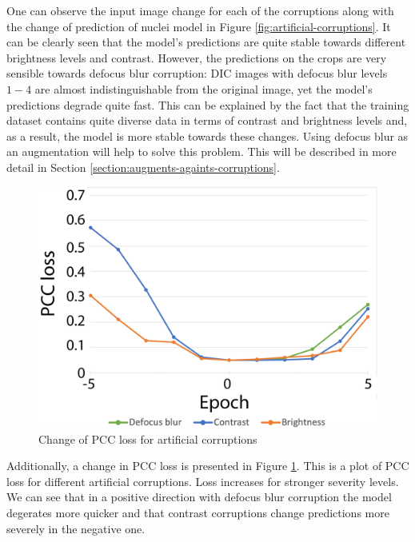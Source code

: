 One can observe the input image change for each of the corruptions along with the change of prediction of nuclei model in Figure \ref{fig:artificial-corruptions}. It can be clearly seen that the model's predictions are quite stable towards different brightness levels and contrast. However, the predictions on the crops are very sensible towards defocus blur corruption: DIC images with defocus blur levels $1-4$ are almost indistinguishable from the original image, yet the model's predictions degrade quite fast. This can be explained by the fact that the training dataset contains quite diverse data in terms of contrast and brightness levels and, as a result, the model is more stable towards these changes. Using defocus blur as an augmentation will help to solve this problem. This will be described in more detail in Section \ref{section:augments-againts-corruptions}.
\begin{figure}[htb]
	\begin{center}
		\includegraphics[width=0.5\linewidth]{bilder/corruptions-loss.png}
		\caption{Change of PCC loss for artificial corruptions}\label{fig:corruptions-loss}
	\end{center}
\end{figure}

Additionally, a change in PCC loss is presented in Figure \ref{fig:corruptions-loss}. This is a plot of PCC loss for different artificial corruptions. Loss increases for stronger severity levels. We can see that in a positive direction with defocus blur corruption the model degerates more quicker and that contrast corruptions change predictions more severely in the negative one.